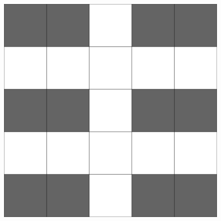 \documentclass[12pt]{ctexart}
\begin{document}
\begin{figure}[htbp]
\begin{minipage}[t]{0.32\textwidth}
			\includegraphics[width=\textwidth]{pictures/2-3.png}
			\caption{}
		\end{minipage}
	\end{figure}
\end{document}
